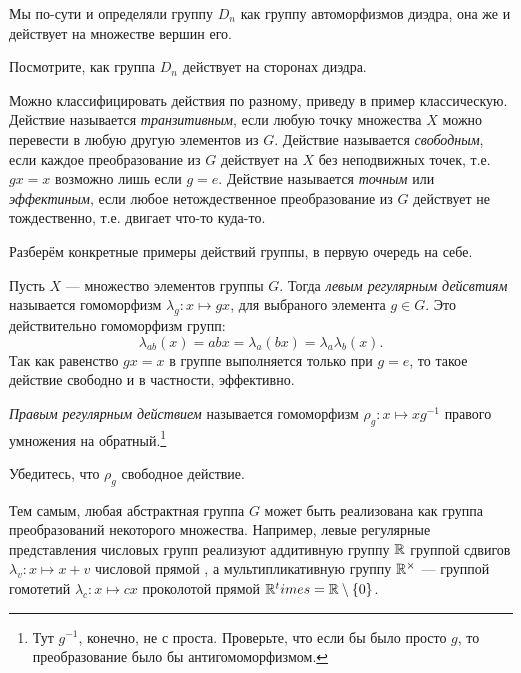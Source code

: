 Мы по-сути и определяли группу $D_n$ как группу автоморфизмов диэдра, она же и действует на множестве вершин его. 

\begin{practice}
    Посмотрите, как группа $D_n$ действует на сторонах диэдра.
\end{practice}

Можно классифицировать действия по разному, приведу в пример классическую. Действие называется \emph{транзитивным}, если любую точку множества $X$ можно перевести в любую другую элементов из $G$. Действие называется \emph{свободным}, если каждое преобразование из $G$ действует на $X$ без неподвижных точек, т.е. $gx = x$ возможно лишь если $g = e$. Действие называется \emph{точным} или \emph{эффектиным}, если любое нетождественное преобразование из $G$ действует не тождественно, т.е. двигает что-то куда-то.

Разберём конкретные примеры действий группы, в первую очередь на себе.
\begin{example}
    Пусть $X$ --- множество элементов группы $G$. Тогда \emph{левым регулярным дейсвтиям} называется гомоморфизм $\lambda_g: x \mapsto gx$, для выбраного элемента $g \in G$. Это действительно гомоморфизм групп: \[
        \lambda_{ab}(x) = abx = \lambda_a (bx) = \lambda_a \lambda_b (x).
    \]
    Так как равенство $gx = x$ в группе выполняется только при $g = e$, то такое действие свободно и в частности, эффективно.
    
    \emph{Правым регулярным действием} называется гомоморфизм $\rho_g: x \mapsto xg^{-1}$ правого умножения на обратный.\footnote{Тут $g^{-1}$, конечно, не с проста. Проверьте, что если бы было просто $g$, то преобразование было бы антигомоморфизмом.}

\end{example}
\begin{practice}
    Убедитесь, что $\rho_g$ свободное действие.
\end{practice}

Тем самым, любая абстрактная группа $G$ может быть реализована как группа преобразований некоторого множества. Например, левые регулярные представления числовых групп реализуют аддитивную группу $\mathbb R$ группой сдвигов $\lambda_v \colon x \mapsto x + v$ числовой прямой , а мультипликативную группу $\mathbb R^\times$ --- группой гомотетий $\lambda_c \colon x \mapsto cx$ проколотой прямой $\mathbb R^times = \mathbb R \setminus \{0\}$.

